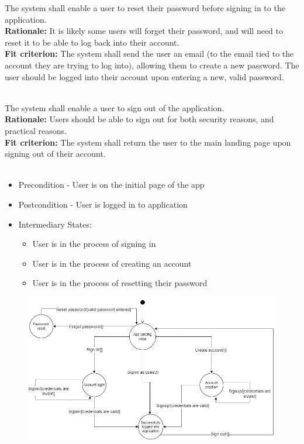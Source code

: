 \documentclass[12pt, titlepage]{article}
\newcounter{FR_Counter}
\begin{document}
The system shall enable a user to reset their password before signing in to the application.\\
\textbf{Rationale:}
It is likely some users will forget their password, and will need to reset it to be able to log back into their account.\\
\textbf{Fit criterion:}
The system shall send the user an email (to the email tied to the account they are trying to log into), allowing them to 
create a new password. The user should be logged into their account upon entering a new, valid password.\\~\\
\addtocounter{FR_Counter}{1}


The system shall enable a user to sign out of the application.\\
\textbf{Rationale:}
Users should be able to sign out for both security reasons, and practical reasons.\\
\textbf{Fit criterion:}
The system shall return the user to the main landing page upon signing out of their account.\\~\\
\addtocounter{FR_Counter}{1}


\begin{itemize}
    \item Precondition - User is on the initial page of the app
    \item Postcondition - User is logged in to application
    \item Intermediary States:
    \begin{itemize}
        \item User is in the process of signing in
        \item User is in the process of creating an account
        \item User is in the process of resetting their password
    \end{itemize} 
\end{itemize}

\begin{figure}[H]
\includegraphics[width=\textwidth]{Signup_state_machine}
\end{figure}
\end{document}
